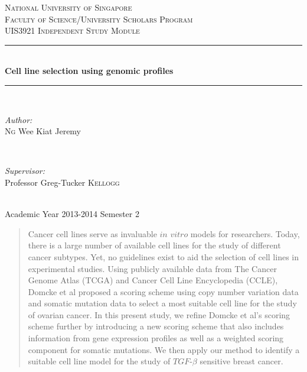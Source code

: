 \documentclass[a4paper,12pt]{article}
\begin{document}

\begin{titlepage}
\date {Academic Year 2013-2014 Semester 2}
\newcommand{\HRule}{\rule{\linewidth}{0.5mm}} %
\center %
\textsc{\LARGE National University of Singapore}\\[1.5cm]
\textsc{\Large Faculty of Science/University Scholars Program}\\[0.5cm]
\textsc{\large UIS3921 Independent Study Module}\\[0.5cm]
\HRule \\[0.4cm]
{ \huge \bfseries Cell line selection using genomic profiles}\\[0.4cm]
\HRule \\[1.5cm]
\begin{minipage}{0.4\textwidth}
\begin{flushleft} \large
\emph{Author:}\\
\textsc{Ng} Wee Kiat Jeremy
\end{flushleft}
\end{minipage}
~
\begin{minipage}{0.4\textwidth}
\begin{flushright} \large
\emph{Supervisor:} \\
Professor Greg-Tucker \textsc{Kellogg}
\end{flushright}
\end{minipage}\\[4cm]


{\large Academic Year 2013-2014 Semester 2}\\[3cm] %




\vfill %

\end{titlepage}
\newpage
\tableofcontents
\newpage
\listoffigures
\listoftables
\newpage
{}
\begin{abstract}
Cancer cell lines serve as invaluable $\textit{in vitro}$ models for
researchers. Today, there is a large number of available cell lines
for the study of different cancer subtypes. Yet, no guidelines exist
to aid the selection of cell lines in experimental studies. Using
publicly available data from The Cancer Genome Atlas (TCGA) and Cancer
Cell Line Encyclopedia (CCLE), Domcke et al proposed a scoring scheme
using copy number variation data and somatic mutation data to select a
most suitable cell line for the study of ovarian cancer. In this
present study, we refine Domcke et al's scoring scheme further by
introducing a new scoring scheme that also includes information from
gene expression profiles as well as a weighted scoring component for
somatic mutations. We then apply our method to identify a suitable
cell line model for the study of $\textit{TGF}$-$\beta$ sensitive
breast cancer.
\end{abstract}
\end{document}
